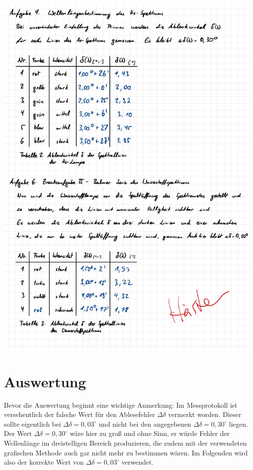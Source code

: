\documentclass{article}
\begin{document}
\includegraphics[width=\textwidth]{graphics/mess3.jpg}
\newpage

\addtocounter{table}{3}

\section{Auswertung}

Bevor die Auswertung beginnt eine wichtige Anmerkung: Im Messprotokoll ist versehentlich der falsche Wert für den Ablesefehler $\Delta \delta$ vermerkt worden. Dieser sollte eigentlich bei $\Delta \delta = 0,03^{\circ}$ und nicht bei den angegebenen $\Delta \delta = 0,30^{\circ}$ liegen. Der Wert $\Delta \delta = 0,30^{\circ}$ wäre hier zu groß und ohne Sinn, er würde Fehler der Wellenlänge im dreistelligen Bereich produzieren, die zudem mit der verwendeten grafischen Methode auch gar nicht mehr zu bestimmen wären. Im Folgenden wird also der korrekte Wert von $\Delta \delta = 0,03^{\circ}$ verwendet. 
\end{document}
